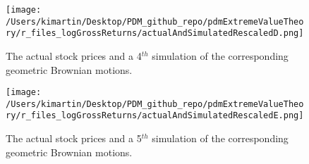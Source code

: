\newpage
\begin{figure}[h!]
	\centering
	\texttt{[image: /Users/kimartin/Desktop/PDM\_github\_repo/pdmExtremeValueTheory/r\_files\_logGrossReturns/actualAndSimulatedRescaledD.png]}
	\caption{The actual stock prices and a 4$^{th}$ simulation of the corresponding geometric Brownian motions.}
	\label{fig:ActualAndManySimulatedGeomBMs4}
\end{figure}
\newpage
\begin{figure}[h!]
	\centering
	\texttt{[image: /Users/kimartin/Desktop/PDM\_github\_repo/pdmExtremeValueTheory/r\_files\_logGrossReturns/actualAndSimulatedRescaledE.png]}
	\caption{The actual stock prices and a 5$^{th}$ simulation of the corresponding geometric Brownian motions.}
	\label{fig:ActualAndManySimulatedGeomBMs5}
\end{figure}
\clearpage
